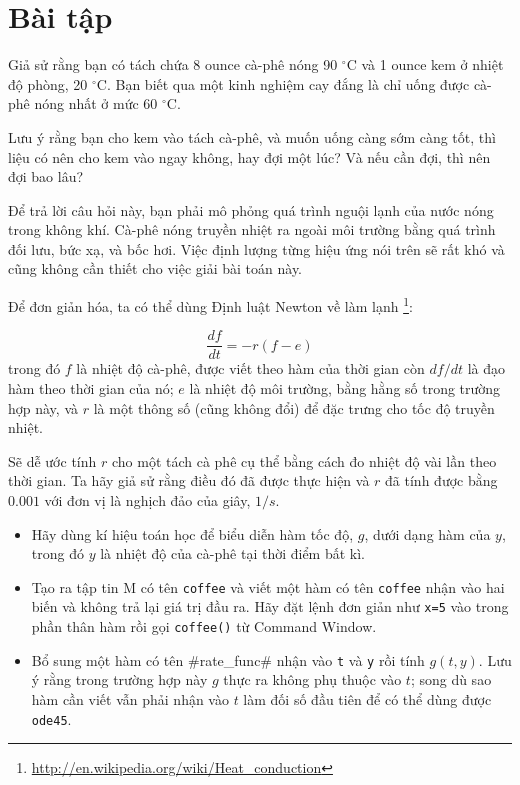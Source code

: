 \documentclass[12pt]{book}
\begin{document}
\section{Bài tập}

\newcommand{\degree}{\ensuremath{^\circ}}

\begin{ex}
Giả sử rằng bạn có tách chứa 8 ounce cà-phê nóng 90 \degree C và
1 ounce kem ở nhiệt độ phòng, 20 \degree C. Bạn biết qua một 
kinh nghiệm cay đắng là chỉ uống được cà-phê nóng nhất ở mức
60 \degree C.

Lưu ý rằng bạn cho kem vào tách cà-phê, và muốn uống càng sớm
càng tốt, thì liệu có nên cho kem vào ngay không, hay đợi một lúc?
Và nếu cần đợi, thì nên đợi bao lâu?

Để trả lời câu hỏi này, bạn phải mô phỏng quá trình nguội lạnh của
nước nóng trong không khí. Cà-phê nóng truyền nhiệt ra ngoài 
môi trường bằng quá trình đối lưu, bức xạ, và bốc hơi. Việc định
lượng từng hiệu ứng nói trên sẽ rất khó và cũng không cần thiết
cho việc giải bài toán này.

Để đơn giản hóa, ta có thể dùng Định luật Newton về làm lạnh
\footnote{\url{http://en.wikipedia.org/wiki/Heat_conduction}}:

\[ \frac{df}{dt} = -r (f - e) \]
%
trong đó $f$ là nhiệt độ cà-phê, được viết theo hàm của thời gian
còn $df/dt$ là đạo hàm theo thời gian của nó; $e$ là nhiệt độ
môi trường, bằng hằng số trong trường hợp này, và $r$ là một
thông số (cũng không đổi) để đặc trưng cho tốc độ truyền nhiệt.

Sẽ dễ ước tính $r$ cho một tách cà phê cụ thể bằng cách đo 
nhiệt độ vài lần theo thời gian. Ta hãy giả sử rằng điều đó đã
được thực hiện và $r$ đã tính được bằng $0.001$ với đơn vị là
nghịch đảo của giây, $1/s$.

\begin{itemize}

\item Hãy dùng kí hiệu toán học để biểu diễn hàm tốc độ, $g$,
dưới dạng hàm của $y$, trong đó $y$ là nhiệt độ của cà-phê
tại thời điểm bất kì.

\item Tạo ra tập tin M có tên {\tt coffee} và viết một hàm có tên
{\tt coffee} nhận vào hai biến và không trả lại giá trị đầu ra.
Hãy đặt lệnh đơn giản như {\tt x=5} vào trong phần thân hàm
rồi gọi  {\tt coffee()} từ Command Window.

\item Bổ sung một hàm có tên \verrb#rate_func# nhận vào 
{\tt t} và {\tt y} rồi tính $g(t,y)$.  Lưu ý rằng trong trường hợp này 
$g$ thực ra không phụ thuộc vào $t$; song dù sao hàm cần viết
vẫn phải nhận vào $t$ làm đối số đầu tiên để có thể dùng được 
{\tt ode45}.


\end{itemize}
\end{ex}
\end{document}
